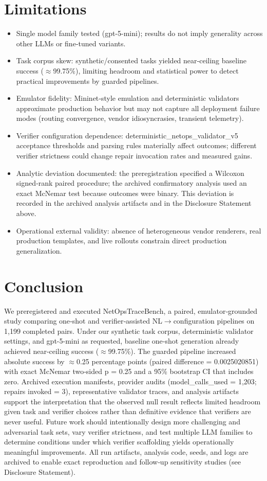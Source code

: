 \documentclass[conference]{IEEEtran}
\begin{document}
\section{Limitations}
\begin{itemize}
\item Single model family tested (gpt-5-mini); results do not imply generality across other LLMs or fine‑tuned variants.
\item Task corpus skew: synthetic/consented tasks yielded near‑ceiling baseline success (\ensuremath{\approx}99.75\%), limiting headroom and statistical power to detect practical improvements by guarded pipelines.
\item Emulator fidelity: Mininet‑style emulation and deterministic validators approximate production behavior but may not capture all deployment failure modes (routing convergence, vendor idiosyncrasies, transient telemetry).
\item Verifier configuration dependence: deterministic\_netops\_validator\_v5 acceptance thresholds and parsing rules materially affect outcomes; different verifier strictness could change repair invocation rates and measured gains.
\item Analytic deviation documented: the preregistration specified a Wilcoxon signed‑rank paired procedure; the archived confirmatory analysis used an exact McNemar test because outcomes were binary. This deviation is recorded in the archived analysis artifacts and in the Disclosure Statement above.
\item Operational external validity: absence of heterogeneous vendor renderers, real production templates, and live rollouts constrain direct production generalization.
\end{itemize}

\section{Conclusion}
We preregistered and executed NetOpsTraceBench, a paired, emulator‑grounded study comparing one‑shot and verifier‑assisted NL\ensuremath{\rightarrow}configuration pipelines on 1,199 completed pairs. Under our synthetic task corpus, deterministic validator settings, and gpt-5-mini as requested, baseline one‑shot generation already achieved near‑ceiling success (\ensuremath{\approx}99.75\%). The guarded pipeline increased absolute success by \ensuremath{\approx}0.25 percentage points (paired difference = 0.0025020851) with exact McNemar two‑sided p = 0.25 and a 95\% bootstrap CI that includes zero. Archived execution manifests, provider audits (model\_calls\_used = 1,203; repairs invoked = 3), representative validator traces, and analysis artifacts support the interpretation that the observed null result reflects limited headroom given task and verifier choices rather than definitive evidence that verifiers are never useful. Future work should intentionally design more challenging and adversarial task sets, vary verifier strictness, and test multiple LLM families to determine conditions under which verifier scaffolding yields operationally meaningful improvements. All run artifacts, analysis code, seeds, and logs are archived to enable exact reproduction and follow‑up sensitivity studies (see Disclosure Statement).
\end{document}
